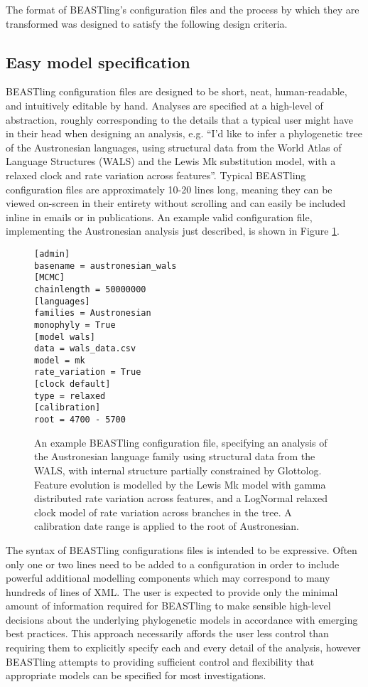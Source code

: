 \documentclass[twocolumn,10pt]{scrartcl}
\begin{document}
The format of BEASTling's configuration files and the process by which they are transformed was designed to satisfy the following design criteria.

\subsection{Easy model specification}

BEASTling configuration files are designed to be short, neat, human-readable, and intuitively editable by hand.  Analyses are specified at a high-level of abstraction, roughly corresponding to the details that a typical user might have in their head when designing an analysis, e.g. ``I'd like to infer a phylogenetic tree of the Austronesian languages, using structural data from the World Atlas of Language Structures\cite{Dryer2013} (WALS) and the Lewis Mk substitution model\cite{Lewis2001}, with a relaxed clock and rate variation across features''.  Typical BEASTling configuration files are approximately 10-20 lines long, meaning they can be viewed on-screen in their entirety without scrolling and can easily be included inline in emails or in publications.  An example valid configuration file, implementing the Austronesian analysis just described, is shown in Figure \ref{fig:config}.

\begin{figure}[t]
	\begin{verbatim}[admin]
basename = austronesian_wals
[MCMC]
chainlength = 50000000
[languages]
families = Austronesian
monophyly = True
[model wals]
data = wals_data.csv
model = mk
rate_variation = True
[clock default]
type = relaxed
[calibration]
root = 4700 - 5700\end{verbatim}
\caption{An example BEASTling configuration file, specifying an analysis of the Austronesian language family using structural data from the WALS, with internal structure partially constrained by Glottolog. Feature evolution is modelled by the Lewis Mk model with gamma distributed rate variation across features, and a LogNormal relaxed clock model of rate variation across branches in the tree.  A calibration date range is applied to the root of Austronesian.}
\label{fig:config}
\end{figure}

The syntax of BEASTling configurations files is intended to be expressive.  Often only one or two lines need to be added to a configuration in order to include powerful additional modelling components which may correspond to many hundreds of lines of XML.  The user is expected to provide only the minimal amount of information required for BEASTling to make sensible high-level decisions about the underlying phylogenetic models in accordance with emerging best practices.  This approach necessarily affords the user less control than requiring them to explicitly specify each and every detail of the analysis, however BEASTling attempts to providing sufficient control and flexibility that appropriate models can be specified for most investigations.
\end{document}
